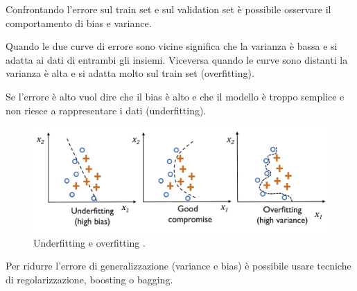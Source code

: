 Confrontando l'errore sul train set e sul validation set è possibile osservare il comportamento di bias e variance.

Quando le due curve di errore sono vicine significa che la varianza è bassa e si adatta ai dati di entrambi gli insiemi.
Viceversa quando le curve sono distanti la varianza è alta e si adatta molto sul train set (overfitting).

Se l'errore è alto vuol dire che il bias è alto e che il modello è troppo semplice e non riesce a rappresentare i dati (underfitting).

\begin{figure}[ht]
  \centering
  \includegraphics[width=0.9\linewidth]{images/fitting.jpeg}
  \caption{Underfitting e overfitting \cite{RaschkaMirjalili2019}.}
\end{figure}

Per ridurre l'errore di generalizzazione (variance e bias) è possibile usare tecniche di regolarizzazione, boosting o bagging.
